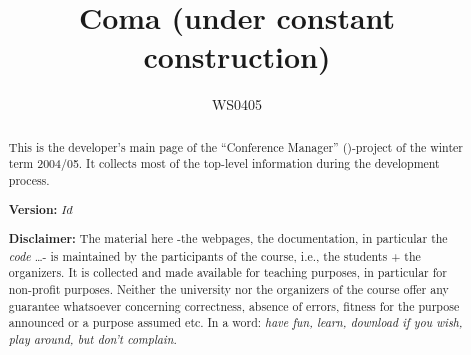 \documentclass[11pt]{article}
\title{{\huge\bf Coma} (under constant construction)}
\author{WS0405}
\date{}
\begin{document}
\vspace{-2cm}





\maketitle{}



\begin{abstract}
  This is the developer's main page of the ``Conference Manager''
  (\Coma)-project of the winter term 2004/05. It collects most of the
  top-level information during the development process.

  \begin{center}
    \textbf{Version:} \texttt{$Id$}
  \end{center}

  \medskip
  
  \textbf{Disclaimer:} The material here -the webpages, the documentation,
  in particular the \emph{code} \ldots- is maintained by the participants
  of the course, i.e., the students + the organizers. It is collected and
  made available for teaching purposes, in particular for non-profit
  purposes. Neither the university nor the organizers of the course offer
  any guarantee whatsoever concerning correctness, absence of errors,
  fitness for the purpose announced or a purpose assumed etc. In a word:
  \emph{have fun, learn, download if you wish, play around, but don't
    complain.}
\end{abstract}




%



%
\end{document}
